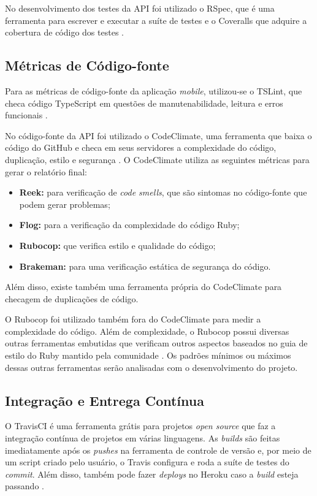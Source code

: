 No desenvolvimento dos testes da API foi utilizado o RSpec, que é uma ferramenta para escrever e executar a suíte de testes \cite{rspec} e o Coveralls que adquire a cobertura de código dos testes \cite{coveralls}.

\subsection{Métricas de Código-fonte}
Para as métricas de código-fonte da aplicação \textit{mobile}, utilizou-se o TSLint, que checa código TypeScript em questões de manutenabilidade, leitura e erros funcionais \cite{tslint}.

No código-fonte da API foi utilizado o CodeClimate, uma ferramenta que baixa o código do GitHub e checa em seus servidores a complexidade do código, duplicação, estilo e segurança \cite{codeclimate}. O CodeClimate utiliza as seguintes métricas para gerar o relatório final:
\begin{itemize}
    \item \textbf{Reek:} para verificação de \textit{code smells}, que são sintomas no código-fonte que podem gerar problemas;
    \item \textbf{Flog:} para a verificação da complexidade do código Ruby;
    \item \textbf{Rubocop:} que verifica estilo e qualidade do código;
    \item \textbf{Brakeman:} para uma verificação estática de segurança do código.
\end{itemize}

Além disso, existe também uma ferramenta própria do CodeClimate para checagem de duplicações de código.

O Rubocop foi utilizado também fora do CodeClimate para medir a complexidade do código. Além de complexidade, o Rubocop possui diversas outras ferramentas embutidas que verificam outros aspectos baseados no guia de estilo do Ruby mantido pela comunidade \cite{rubocop}. Os padrões mínimos ou máximos dessas outras ferramentas serão analisadas com o desenvolvimento do projeto.

\subsection{Integração e Entrega Contínua}

O TravisCI é uma ferramenta grátis para projetos \textit{open source} que faz a integração contínua de projetos em várias linguagens. As \textit{builds} são feitas imediatamente após os \textit{pushes} na ferramenta de controle de versão e, por meio de um script criado pelo usuário, o Travis configura e roda a suíte de testes do \textit{commit}. Além disso, também pode fazer \textit{deploys} no Heroku caso a \textit{build} esteja passando \cite{travis-ci}.

